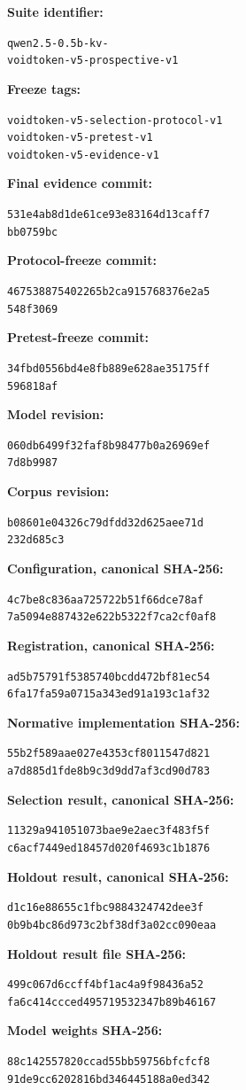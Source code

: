\documentclass[10pt,twocolumn]{article}
\newcommand{\digest}[2]{%
  \texttt{\scriptsize #1}\\[-1pt]\texttt{\scriptsize #2}}
\begin{document}
\begin{sloppypar}
\small
\begin{description}[
  leftmargin=0pt,
  labelindent=0pt,
  itemsep=0pt,
  parsep=0pt,
  topsep=0pt
]
  \item[] \textbf{Suite identifier:}\par
  \digest{qwen2.5-0.5b-kv-}{voidtoken-v5-prospective-v1}
  \item[] \textbf{Freeze tags:}\par
  \texttt{\scriptsize voidtoken-v5-selection-protocol-v1}\\[-1pt]
  \texttt{\scriptsize voidtoken-v5-pretest-v1}\\[-1pt]
  \texttt{\scriptsize voidtoken-v5-evidence-v1}
  \item[] \textbf{Final evidence commit:}\par
  \digest{531e4ab8d1de61ce93e83164d13caff7}{bb0759bc}
  \item[] \textbf{Protocol-freeze commit:}\par
  \digest{467538875402265b2ca915768376e2a5}{548f3069}
  \item[] \textbf{Pretest-freeze commit:}\par
  \digest{34fbd0556bd4e8fb889e628ae35175ff}{596818af}
  \item[] \textbf{Model revision:}\par
  \digest{060db6499f32faf8b98477b0a26969ef}{7d8b9987}
  \item[] \textbf{Corpus revision:}\par
  \digest{b08601e04326c79dfdd32d625aee71d}{232d685c3}
  \item[] \textbf{Configuration, canonical SHA-256:}\par
  \digest{4c7be8c836aa725722b51f66dce78af}{7a5094e887432e622b5322f7ca2cf0af8}
  \item[] \textbf{Registration, canonical SHA-256:}\par
  \digest{ad5b75791f5385740bcdd472bf81ec54}{6fa17fa59a0715a343ed91a193c1af32}
  \item[] \textbf{Normative implementation SHA-256:}\par
  \digest{55b2f589aae027e4353cf8011547d821}{a7d885d1fde8b9c3d9dd7af3cd90d783}
  \item[] \textbf{Selection result, canonical SHA-256:}\par
  \digest{11329a941051073bae9e2aec3f483f5f}{c6acf7449ed18457d020f4693c1b1876}
  \item[] \textbf{Holdout result, canonical SHA-256:}\par
  \digest{d1c16e88655c1fbc9884324742dee3f}{0b9b4bc86d973c2bf38df3a02cc090eaa}
  \item[] \textbf{Holdout result file SHA-256:}\par
  \digest{499c067d6ccff4bf1ac4a9f98436a52}{fa6c414ccced495719532347b89b46167}
  \item[] \textbf{Model weights SHA-256:}\par
  \digest{88c142557820ccad55bb59756bfcfcf8}{91de9cc6202816bd346445188a0ed342}
\end{description}
\end{sloppypar}
\end{document}
